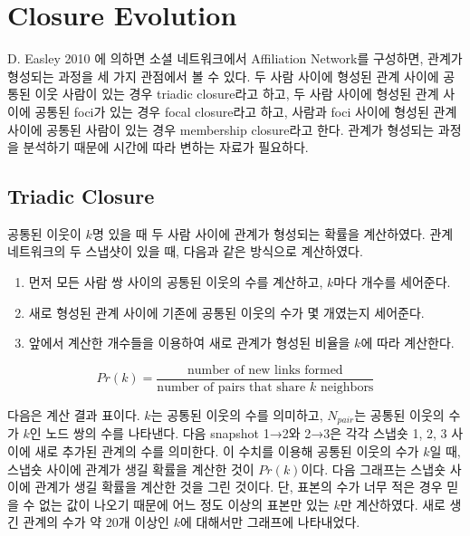 \documentclass[10pt, a4paper, titlepage]{article}
\begin{document}
\section{Closure Evolution}

D. Easley  2010 \cite{r2}에 의하면 소셜 네트워크에서 Affiliation Network를 구성하면, 관계가 형성되는 과정을 세 가지 관점에서 볼 수 있다. 두 사람 사이에 형성된 관계 사이에 공통된 이웃 사람이 있는 경우 triadic closure라고 하고, 두 사람 사이에 형성된 관계 사이에 공통된 foci가 있는 경우 focal closure라고 하고, 사람과 foci 사이에 형성된 관계 사이에 공통된 사람이 있는 경우 membership closure라고 한다. 관계가 형성되는 과정을 분석하기 때문에 시간에 따라 변하는 자료가 필요하다. 

\subsection{Triadic Closure}

공통된 이웃이 $k$명 있을 때 두 사람 사이에 관계가 형성되는 확률을 계산하였다. 관계 네트워크의 두 스냅샷이 있을 때, 다음과 같은 방식으로 계산하였다.
\begin{enumerate}
\item 먼저 모든 사람 쌍 사이의 공통된 이웃의 수를 계산하고, $k$마다 개수를 세어준다.
\item 새로 형성된 관계 사이에 기존에 공통된 이웃의 수가 몇 개였는지 세어준다.
\item 앞에서 계산한 개수들을 이용하여 새로 관계가 형성된 비율을 $k$에 따라 계산한다.
\end{enumerate}

$$
Pr(k) = \frac{\textrm{number of new links formed}}{\textrm{number of pairs that share } k \textrm{ neighbors}}
$$

다음은 계산 결과 표이다. $k$는 공통된 이웃의 수를 의미하고, $N_{pair}$는 공통된 이웃의 수가 $k$인 노드 쌍의 수를 나타낸다. 다음 snapshot 1→2와 2→3은 각각 스냅숏 1, 2, 3 사이에 새로 추가된 관계의 수를 의미한다. 이 수치를 이용해  공통된 이웃의 수가 $k$일 때, 스냅숏 사이에 관계가 생길 확률을 계산한 것이 $Pr(k)$이다. 다음 그래프는 스냅숏 사이에 관계가 생길 확률을 계산한 것을 그린 것이다. 단, 표본의 수가 너무 적은 경우 믿을 수 없는 값이 나오기 때문에 어느 정도 이상의 표본만 있는 $k$만 계산하였다. 새로 생긴 관계의 수가 약 20개 이상인 $k$에 대해서만 그래프에 나타내었다. 
\end{document}
